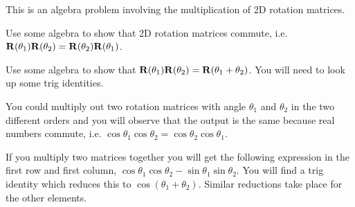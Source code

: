 \begin{prob}
This is an algebra problem involving the multiplication of 2D rotation matrices.
\be
\item Use some algebra to show that 2D rotation matrices commute, i.e. $\mathbf{R}(\theta_1) \mathbf{R}(\theta_2) = \mathbf{R}(\theta_2) \mathbf{R}(\theta_1)$.
\item Use some algebra to show that $\mathbf{R}(\theta_1) \mathbf{R}(\theta_2) = \mathbf{R}(\theta_1+\theta_2)$. You will need to look up some trig identities.
\ee
\end{prob}

\begin{sol}
\be
\item You could multiply out two rotation matrices with angle $\theta_1$ and $\theta_2$ in the two different orders and you will observe that the output is the same because real numbers commute, i.e. $\cos \theta_1 \cos \theta_2 = \cos \theta_2 \cos \theta_1$.
\item If you multiply two matrices together you will get the following expression in the first row and first column, $\cos \theta_1 \cos \theta_2 - \sin \theta_1 \sin \theta_2$. You will find a trig identity which reduces this to $ \cos (\theta_1 + \theta_2)$. Similar reductions take place for the other elements.
\ee
\end{sol}


